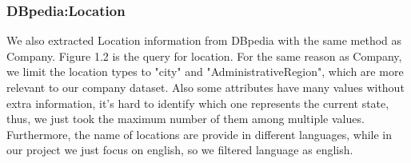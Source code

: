 \subsubsection{DBpedia:Location}
We also extracted Location information from DBpedia with the same method as Company. Figure 1.2 is the query for location. For the same reason as Company, we limit the location types to "city" and "AdministrativeRegion", which are more relevant to our company dataset. Also some attributes have many values without extra information, it's hard to identify which one represents the current state, thus, we just took the maximum number of them among multiple values. Furthermore, the name of locations are provide in different languages, while in our project we just focus on english, so we filtered language as english.